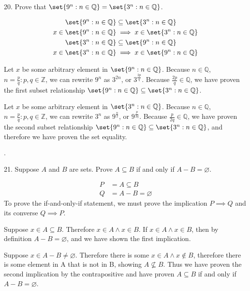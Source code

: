\documentclass{hippoidC}
\begin{document}
\begin{prooflist}{20. Prove that $\set{9^n: n \in \mathbb{Q}}=\set{3^n: n \in
				\mathbb{Q}}$.}
	\item
	\begin{align*}
		\set{9^n: n \in \mathbb{Q}}      & \subseteq\set{3^n: n \in \mathbb{Q}}     \\
		x\in \set{9^n: n \in \mathbb{Q}} & \implies x\in\set{3^n: n \in \mathbb{Q}} \\
		\set{3^n: n \in \mathbb{Q}}
		                                 & \subseteq
		\set{9^n: n \in \mathbb{Q}}                                                 \\
		x\in\set{3^n: n \in \mathbb{Q}}
		                                 & \implies
		x\in \set{9^n: n \in \mathbb{Q}}
	\end{align*}
	\item Let $x$ be some arbitrary element in $\set{9^n: n \in \mathbb{Q}}$.
	Because $n\in\mathbb{Q}$, $n=\frac{p}{q}: p,q\in\mathbb{Z}$,
	we can rewrite $9^n$ as $3^{2n}$, or $3^{\frac{2p}{q}}$. Because
	$\frac{2p}{q} \in \mathbb{Q}$, we have proven the first subset
	relationship $\set{9^n: n \in \mathbb{Q}} \subseteq\set{3^n: n \in
			\mathbb{Q}}$.
	\item Let $x$ be some arbitrary element in $\set{3^n: n \in \mathbb{Q}}$.
	Because $n\in\mathbb{Q}$, $n=\frac{p}{q}: p,q\in\mathbb{Z}$,
	we can rewrite $3^n$ as $9^{\frac{n}{2}}$, or $9^{\frac{p}{2q}}$. Because
	$\frac{p}{2q} \in \mathbb{Q}$, we have proven the second subset
	relationship $\set{9^n: n \in \mathbb{Q}} \subseteq\set{3^n: n \in
			\mathbb{Q}}$, and therefore we have proven the set equality.
\end{prooflist}.

\begin{prooflist}{21. Suppose $A$ and $B$ are sets. Prove $A \subseteq B$ if and only if $A-B=\varnothing$.}
	\item
	\begin{align*}
		P & = A \subseteq B       \\
		Q & = A - B = \varnothing
	\end{align*}
	To prove the if-and-only-if statement, we must prove the implication $P\implies
		Q$ and its converse $Q\implies P$.
	\item Suppose $x\in A\subseteq B$. Therefore $x\in A \land x \in B$. If $x\in
		A\land x\in B$, then by definition $A-B=\varnothing$, and we have shown the
	first implication.
	\item Suppose $x\in A-B\neq\varnothing$. Therefore there is some $x\in A\land
		x\notin B$, therefore there is some element in A that is not in B, showing
	$A\not\subseteq B$. Thus we have proven the second implication by the
	contrapositive and have proven $A \subseteq B$ if and only if
	$A-B=\varnothing$.
\end{prooflist}
\end{document}
